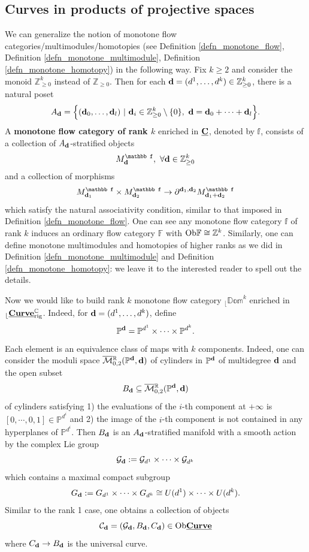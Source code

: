 \documentclass[reqno, 10pt]{amsart}
\numberwithin{equation}{section}
\numberwithin{equation}{section}
\renewcommand{\subset}{\subseteq}
\theoremstyle{definition}
\theoremstyle{remark}
\newcommand{\beqn}{\begin{equation*}}
\newcommand{\eeqn}{\end{equation*}}
\newcommand{\ov}{\overline}
\newcommand{\mb}{\mathbb}
\newcommand{\mc}{\mathcal}
\renewcommand{\outer}{{}_{\lfloor}}
\newcommand{\uds}[1]{\underline{\smash{#1}}}
\begin{document}
\subsection{Curves in products of projective spaces}

We can generalize the notion of monotone flow categories/multimodules/homotopies (see Definition \ref{defn_monotone_flow}, Definition \ref{defn_monotone_multimodule}, Definition \ref{defn_monotone_homotopy}) in the following way. Fix $k \geq 2$ and consider the monoid ${\mb Z}_{\geq 0}^k$ instead of ${\mb Z}_{\geq 0}$. Then for each ${\bf d} = (d^1, \ldots, d^k) \in {\mb Z}_{\geq 0}^k$, there is a natural poset
\beqn
A_{\bf d} = \Big\{ ({\bf d}_0, \ldots, {\bf d}_l)\ |\ {\bf d}_i \in {\mb Z}_{\geq 0}^k \setminus \{0\},\ {\bf d} = {\bf d}_0 + \cdots + {\bf d}_l \Big\}.
\eeqn
A {\bf monotone flow category of rank $k$} enriched in $\uds {\bf C}$, denoted by ${\mb f}$, consists of a collection of $A_{\bf d}$-stratified objects
\beqn
M_{\bf d}^{\mb f},\ \forall {\bf d} \in {\mb Z}_{\geq 0}^k
\eeqn
and a collection of morphisms
\beqn
M_{{\bf d}_1}^{\mb f} \times M_{{\bf d}_2}^{\mb f} \to \partial^{{\bf d}_1, {\bf d}_2} M_{{\bf d}_1 + {\bf d}_2}^{\mb f}
\eeqn
which satisfy the natural associativity condition, similar to that imposed in Definition \ref{defn_monotone_flow}. One can see any monotone flow category ${\mb f}$ of rank $k$ induces an ordinary flow category ${\mb F}$ with ${\rm Ob}{\mb F} \cong {\mb Z}^k$. Similarly, one can define monotone multimodules and homotopies of higher ranks as we did in Definition \ref{defn_monotone_multimodule} and Definition \ref{defn_monotone_homotopy}: we leave it to the interested reader to spell out the details.

Now we would like to build rank $k$ monotone flow category $\outer \mb{Dom}^k$ enriched in $\outer \uds{\bf Curve}_{\rm rig}^{\mb C}$. Indeed, for ${\bf d} = (d^1, \ldots, d^k)$, define
\beqn
{\mb P}^{\bf d} = {\mb P}^{d^1} \times \cdots \times {\mb P}^{d^k}.
\eeqn
Each element is an equivalence class of maps with $k$ components. Indeed, one can consider the moduli space $\ov{\mc M}{}_{0, 2}^{\mb R}(\mb{P}^{\bf d}, {\bf d})$ of cylinders in $\mb{P}^{\bf d}$ of multidegree ${\bf d}$ and the open subset 
\beqn
B_{\bf d}  \subset \ov{\mc M}{}_{0, 2}^{\mb R}(\mb{P}^{\bf d}, {\bf d})
\eeqn
of cylinders satisfying 1) the evaluations of the $i$-th component at  $+\infty$ is  $[0, \cdots, 0, 1] \in \mb{P}^{d^i}$ and 2) the image of the $i$-th component is not contained in any hyperplanes of $\mb{P}^{d^i}$. Then $B_{\bf d} $ is an $A_{\bf d}$-stratified manifold with a smooth action by the complex Lie group
\beqn
{\mc G}_{\bf d} := {\mc G}_{d^1}  \times \cdots \times {\mc G}_{d^k} 
\eeqn
which contains a maximal compact subgroup
\beqn
G_{\bf d} := G_{d^1}  \times \cdots \times G_{d^k}  \cong U(d^1) \times \cdots \times U(d^k).
\eeqn
Similar to the rank 1 case, one obtains a collection of objects
\beqn
{\mc C}_{\bf d}    = ({\mc G}_{\bf d} , B_{\bf d} , C_{\bf d} ) \in {\rm Ob} \uds{\bf Curve}
\eeqn
where $C_{\bf d}  \to B_{\bf d} $ is the universal curve. 
\end{document}
